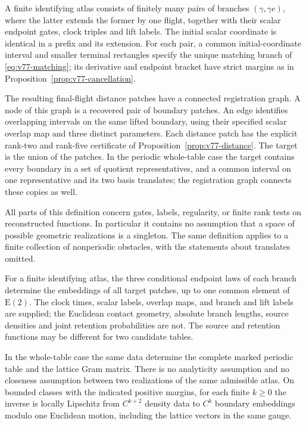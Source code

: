 \begin{definition}\label{def:v77-atlas}
A finite identifying atlas consists of finitely many pairs of branches
$(\gamma,\gamma e)$, where the latter extends the former by one flight,
together with their scalar endpoint gates, clock triples and lift labels.
The initial scalar coordinate is identical in a prefix and its extension.
For each pair, a common initial-coordinate interval and smaller terminal
rectangles specify the unique matching branch of
\eqref{eq:v77-matching}; its derivative and endpoint bracket have strict
margins as in Proposition~\ref{prop:v77-cancellation}.

The resulting final-flight distance patches have a connected registration
graph.  A node of this graph is a recovered pair of boundary patches.
An edge identifies overlapping intervals on the same lifted boundary,
using their specified scalar overlap map and three distinct parameters.
Each distance patch has the explicit rank-two and rank-five certificate
of Proposition~\ref{prop:v77-distance}.  The target is the union of the
patches.  In the periodic whole-table case the target contains every
boundary in a set of quotient representatives, and a common interval on
one representative and its two basis translates; the registration graph
connects these copies as well.
\end{definition}

All parts of this definition concern gates, labels, regularity, or finite
rank tests on reconstructed functions.  In particular it contains no
assumption that a space of possible geometric realizations is a singleton.
The same definition applies to a finite collection of nonperiodic
obstacles, with the statements about translates omitted.

\begin{theorem}
\label{thm:v77-main}
For a finite identifying atlas, the three conditional endpoint laws of
each branch determine the embeddings of all target patches, up to one
common element of $\mathrm E(2)$.  The clock times, scalar labels,
overlap maps, and branch and lift labels are supplied; the Euclidean
contact geometry, absolute branch lengths, source densities and joint
retention probabilities are not.  The source and retention functions
may be different for two candidate tables.

In the whole-table case the same data determine the complete marked
periodic table and the lattice Gram matrix.  There is no analyticity
assumption and no closeness assumption between two realizations of the
same admissible atlas.  On bounded classes with the indicated positive
margins, for each finite $k\ge0$ the inverse is locally Lipschitz from
$C^{k+2}$ density data to $C^k$ boundary embeddings modulo one Euclidean
motion, including the lattice vectors in the same gauge.
\end{theorem}

